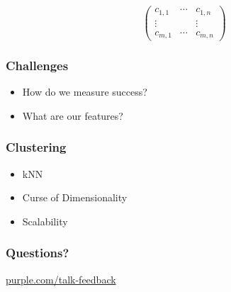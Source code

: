 \begin{frame}
{\begin{displaymath}
\begin{pmatrix}
        c_{1,1} & \cdots & c_{1,n} \\
        \vdots & & \vdots \\
        c_{m,1} & \cdots & c_{m,n}
      \end{pmatrix}
    \end{displaymath}
  }
  
\end{frame}

\begin{frame}
  \frametitle{Challenges}

  \begin{itemize}
  \item How do we measure success?
  \item What are our features?
  \end{itemize}
\end{frame}

\begin{frame}
  \frametitle{Clustering}

  \begin{itemize}
  \item kNN 
  \item Curse of Dimensionality
  \item Scalability 
  \end{itemize}
\end{frame}


\begin{frame}
  \frametitle{Questions?}
  \centerline{\large\url{purple.com/talk-feedback}}
\end{frame}


